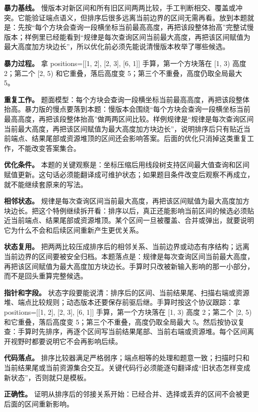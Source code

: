 \textbf{暴力基线。} 慢版本对新区间和所有旧区间两两比较，手工判断相交、覆盖或冲突。它能验证端点语义，但排序后很多远离当前边界的区间无需再看。放到本题就是：先按“每个方块会查询一段横坐标当前最高高度，再把该段整体抬高”完整试慢版本；样例里已经能看到“规律是每次查询区间当前最大高度，再把该区间赋值为最大高度加方块边长”，所以优化前必须先能说清慢版本枚举了哪些候选。

\textbf{暴力过程。} 拿 positions=[[1, 2], [2, 3], [6, 1]] 手算，第一个方块落在 [1, 3) 高度 2；第二个 [2, 5) 和它重叠，落后高度变 5；第三个不重叠，高度仍取全局最大 5。

\textbf{重复工作。} 题面模型：每个方块会查询一段横坐标当前最高高度，再把该段整体抬高。暴力版的慢点要落到本题：慢版本会围绕“每个方块会查询一段横坐标当前最高高度，再把该段整体抬高”做两两区间比较。样例规律是“规律是每次查询区间当前最大高度，再把该区间赋值为最大高度加方块边长”，说明排序后只有贴近当前端点、结果尾部或资源堆顶的区间还会影响答案。后面的优化只消掉这类重复工作，不能改变答案集合。

\textbf{优化条件。} 本题的关键观察是：坐标压缩后用线段树支持区间最大值查询和区间赋值更新。这句话必须能翻译成可维护状态；如果题目条件改变后观察不再成立，就不能继续套原来的写法。

\textbf{相邻状态。} 规律是每次查询区间当前最大高度，再把该区间赋值为最大高度加方块边长。把这个特例继续拆开看：排序以后，真正还能影响当前区间的候选必须贴近当前端点、结果尾部或资源堆顶。某个区间一旦被覆盖、合并或弹出，就要说明它为什么不会和后续区间重新产生更优关系。

\textbf{状态复用。} 把两两比较压成排序后的相邻关系、当前边界或动态有序结构；远离当前边界的区间要被安全归档。本题落点是：规律是每次查询区间当前最大高度，再把该区间赋值为最大高度加方块边长。手算时只改被新输入影响的那一小部分，而不是回头重算完整候选。

\textbf{指针和字段。} 状态字段要能说清：排序后的区间、当前结果尾、扫描右端或资源堆、端点比较规则；动态版本还要保存前驱后继。手算时按这个协议跟踪：拿 positions=[[1, 2], [2, 3], [6, 1]] 手算，第一个方块落在 [1, 3) 高度 2；第二个 [2, 5) 和它重叠，落后高度变 5；第三个不重叠，高度仍取全局最大 5。然后按协议复查：手算时先排序，再逐个区间写当前结果尾部、当前右端或资源堆。每个区间离开视野时都要说明它不会再影响后续。

\textbf{代码落点。} 排序比较器满足严格弱序；端点相等的处理和题意一致；扫描时只和当前结果尾或当前资源集合交互。关键代码行必须能逐句翻译成“旧状态怎样变成新状态”，否则就只是模板。

\textbf{正确性。} 证明从排序后的邻接关系开始：已经合并、选择或丢弃的区间不会被更后面的区间重新影响。

